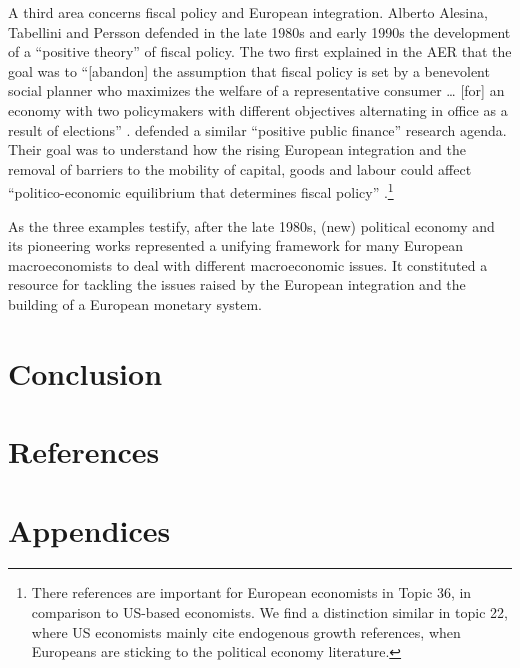 \documentclass[]{elsarticle} %
\newlength{\cslhangindent}
\newlength{\cslentryspacingunit} %
\newenvironment{CSLReferences}[2] %
 {%
  \setlength{\parindent}{0pt}
  \ifodd #1
  \let\oldpar\par
  \def\par{\hangindent=\cslhangindent\oldpar}
  \fi
  \setlength{\parskip}{#2\cslentryspacingunit}
 }%
 {}
\begin{document}
A third area concerns fiscal policy and European integration. Alberto
Alesina, Tabellini and Persson defended in the late 1980s and early
1990s the development of a ``positive theory'' of fiscal policy. The two
first explained in the AER that the goal was to ``{[}abandon{]} the
assumption that fiscal policy is set by a benevolent social planner who
maximizes the welfare of a representative consumer \ldots{} {[}for{]} an
economy with two policymakers with different objectives alternating in
office as a result of elections'' \citep{alesina1990}.
\citet{persson1992} defended a similar ``positive public finance''
research agenda. Their goal was to understand how the rising European
integration and the removal of barriers to the mobility of capital,
goods and labour could affect ``politico-economic equilibrium that
determines fiscal policy'' \citep[689]{persson1992}.\footnote{There
  references are important for European economists in Topic 36, in
  comparison to US-based economists. We find a distinction similar in
  topic 22, where US economists mainly cite endogenous growth
  references, when Europeans are sticking to the political economy
  literature.}

As the three examples testify, after the late 1980s, (new) political
economy and its pioneering works
\citep{kydland1977, barro1983, barro1983c, rogoff1985b} represented a
unifying framework for many European macroeconomists to deal with
different macroeconomic issues. It constituted a resource for tackling
the issues raised by the European integration and the building of a
European monetary system.

\hypertarget{conclusion}{%
\section*{Conclusion}\label{conclusion}}

\newpage

\hypertarget{references}{%
\section*{References}\label{references}}

\hypertarget{refs}{}
\begin{CSLReferences}{0}{0}
\end{CSLReferences}

\newpage

\hypertarget{appendices}{%
\section*{Appendices}\label{appendices}}
\end{document}
